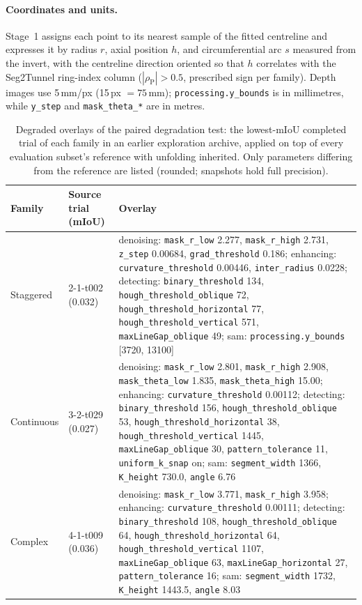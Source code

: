 \documentclass[a4paper,fleqn]{cas-dc}
\begin{document}
\paragraph{Coordinates and units.}
Stage~1 assigns each point to its nearest sample of the fitted centreline and expresses it by radius $r$, axial position $h$, and circumferential arc $s$ measured from the invert, with the centreline direction oriented so that $h$ correlates with the Seg2Tunnel ring-index column ($|\rho_{\mathrm P}|>0.5$, prescribed sign per family). Depth images use 5\,mm/px (15\,px $=75$\,mm); \texttt{processing.y\_bounds} is in millimetres, while \texttt{y\_step} and \texttt{mask\_theta\_*} are in metres.

\begin{table}[t]
\caption{Degraded overlays of the paired degradation test: the lowest-mIoU completed trial of each family in an earlier exploration archive, applied on top of every evaluation subset's reference with unfolding inherited. Only parameters differing from the reference are listed (rounded; snapshots hold full precision).}
\label{tab:degraded-overlays}
\centering
\small
\begin{tabular*}{\textwidth}{@{\extracolsep{\fill}} l l Y{0.62\textwidth} @{}}
\toprule
Family & Source trial (mIoU) & Overlay \\
\midrule
Staggered & 2-1-t002 (0.032) & denoising: \texttt{mask\_r\_low} 2.277, \texttt{mask\_r\_high} 2.731, \texttt{z\_step} 0.00684, \texttt{grad\_threshold} 0.186; enhancing: \texttt{curvature\_threshold} 0.00446, \texttt{inter\_radius} 0.0228; detecting: \texttt{binary\_threshold} 134, \texttt{hough\_threshold\_oblique} 72, \texttt{hough\_threshold\_horizontal} 77, \texttt{hough\_threshold\_vertical} 571, \texttt{maxLineGap\_oblique} 49; sam: \texttt{processing.y\_bounds} [3720, 13100] \\
\addlinespace
Continuous & 3-2-t029 (0.027) & denoising: \texttt{mask\_r\_low} 2.801, \texttt{mask\_r\_high} 2.908, \texttt{mask\_theta\_low} 1.835, \texttt{mask\_theta\_high} 15.00; enhancing: \texttt{curvature\_threshold} 0.00112; detecting: \texttt{binary\_threshold} 156, \texttt{hough\_threshold\_oblique} 53, \texttt{hough\_threshold\_horizontal} 38, \texttt{hough\_threshold\_vertical} 1445, \texttt{maxLineGap\_oblique} 30, \texttt{pattern\_tolerance} 11, \texttt{uniform\_k\_snap} on; sam: \texttt{segment\_width} 1366, \texttt{K\_height} 730.0, \texttt{angle} 6.76 \\
\addlinespace
Complex & 4-1-t009 (0.036) & denoising: \texttt{mask\_r\_low} 3.771, \texttt{mask\_r\_high} 3.958; enhancing: \texttt{curvature\_threshold} 0.00111; detecting: \texttt{binary\_threshold} 108, \texttt{hough\_threshold\_oblique} 64, \texttt{hough\_threshold\_horizontal} 64, \texttt{hough\_threshold\_vertical} 1107, \texttt{maxLineGap\_oblique} 63, \texttt{maxLineGap\_horizontal} 27, \texttt{pattern\_tolerance} 16; sam: \texttt{segment\_width} 1732, \texttt{K\_height} 1443.5, \texttt{angle} 8.03 \\
\bottomrule
\end{tabular*}
\end{table}
\end{document}
